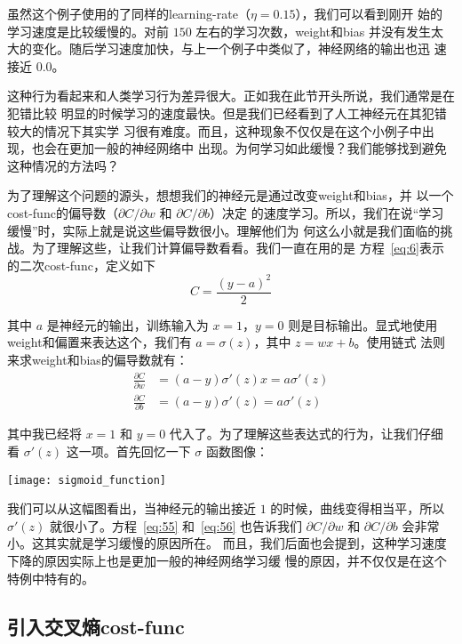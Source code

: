 虽然这个例子使用的了同样的\gls*{learning-rate}（$\eta=0.15$），我们可以看到刚开
始的学习速度是比较缓慢的。对前 $150$ 左右的学习次数，\gls*{weight}和\gls*{bias}
并没有发生太大的变化。随后学习速度加快，与上一个例子中类似了，神经网络的输出也迅
速接近 $0.0$。

这种行为看起来和人类学习行为差异很大。正如我在此节开头所说，我们通常是在犯错比较
明显的时候学习的速度最快。但是我们已经看到了人工神经元在其犯错较大的情况下其实学
习很有难度。而且，这种现象不仅仅是在这个小例子中出现，也会在更加一般的神经网络中
出现。为何学习如此缓慢？我们能够找到避免这种情况的方法吗？

为了理解这个问题的源头，想想我们的神经元是通过改变\gls*{weight}和\gls*{bias}，并
以一个\gls*{cost-func}的偏导数（$\partial C/\partial w$ 和 $\partial C/\partial b$）决定
的速度学习。所以，我们在说“学习缓慢”时，实际上就是说这些偏导数很小。理解他们为
何这么小就是我们面临的挑战。为了理解这些，让我们计算偏导数看看。我们一直在用的是
方程~\eqref{eq:6}表示的二次\gls*{cost-func}，定义如下
\begin{equation}
  C = \frac{(y-a)^2}{2}
\label{eq:54}\tag{54}
\end{equation}

其中 $a$ 是神经元的输出，训练输入为 $x=1$，$y=0$ 则是目标输出。显式地使用%
\gls*{weight}和偏置来表达这个，我们有 $a = \sigma(z)$，其中 $z = wx+b$。使用链式
法则来求\gls*{weight}和\gls*{bias}的偏导数就有：
\begin{align}
  \frac{\partial C}{\partial w} &= (a-y)\sigma'(z) x = a \sigma'(z)\label{eq:55}\tag{55}\\
  \frac{\partial C}{\partial b} &= (a-y)\sigma'(z) = a \sigma'(z)\label{eq:56}\tag{56}
\end{align}

其中我已经将 $x = 1$ 和 $y = 0$ 代入了。为了理解这些表达式的行为，让我们仔细看
$\sigma'(z)$ 这一项。首先回忆一下 $\sigma$ 函数图像：
\begin{center}
  \texttt{[image: sigmoid\_function]}
\end{center}

我们可以从这幅图看出，当神经元的输出接近 $1$ 的时候，曲线变得相当平，所以
$\sigma'(z)$ 就很小了。方程~\eqref{eq:55} 和~\eqref{eq:56} 也告诉我们 $\partial
C/\partial w$ 和 $\partial C/\partial b$ 会非常小。这其实就是学习缓慢的原因所在。
而且，我们后面也会提到，这种学习速度下降的原因实际上也是更加一般的神经网络学习缓
慢的原因，并不仅仅是在这个特例中特有的。

\subsection{引入交叉熵\gls*{cost-func}}
\label{sec:introducing_the_cross-entropy_cost_function}

